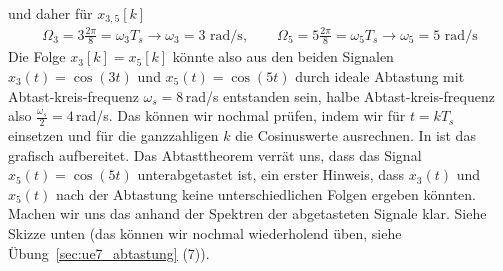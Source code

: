 \begin{ExCalc}
\begin{align}
\end{align}
und daher für $x_{3,5}[k]$
\begin{align}
\Omega_3 = 3\frac{2\pi}{8} = \omega_3 T_s \rightarrow \omega_3 = 3 \text{ rad/s},\quad\quad
\Omega_5 = 5\frac{2\pi}{8} = \omega_5 T_s \rightarrow \omega_5 = 5 \text{ rad/s}
\end{align}
%
Die Folge $x_3[k]=x_5[k]$ könnte also aus den beiden Signalen $x_3(t)=\cos(3 t)$
und $x_5(t) = \cos(5 t)$ durch ideale Abtastung mit Abtast-kreis-frequenz
$\omega_s = 8$\,rad/s entstanden sein, halbe Abtast-kreis-frequenz also
$\frac{\omega_s}{2} = 4$\,rad/s.
%
Das können wir nochmal prüfen, indem wir für $t=k T_s$
einsetzen und für die ganzzahligen $k$ die Cosinuswerte ausrechnen.
In  ist das grafisch aufbereitet.
%
Das Abtasttheorem verrät uns, dass das Signal $x_5(t) = \cos(5 t)$ unterabgetastet
ist, ein erster Hinweis, dass $x_3(t)$ und $x_5(t)$ nach der Abtastung keine
unterschiedlichen Folgen ergeben könnten.
%
Machen wir uns das anhand der Spektren der abgetasteten Signale klar. Siehe Skizze
unten (das können wir nochmal wiederholend üben, siehe Übung~\ref{sec:ue7_abtastung} (7)).
%
\begin{center}
\end{center}
\end{ExCalc}
